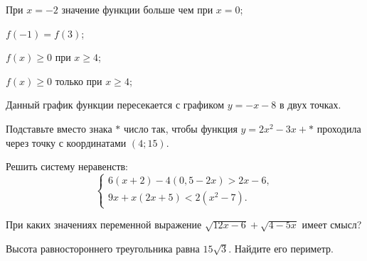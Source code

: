 \begin{class}[number=2]
\begin{listofex}
\begin{enumcols}[itemcolumns=1]
			\item При \( x=-2 \) значение функции больше чем при \( x=0 \);
			\item \( f(-1)=f(3) \);
			\item \( f(x)\ge0 \) при \( x\ge4 \);
			\item \( f(x)\ge0 \) только при \( x\ge4 \);
			\item Данный график функции пересекается с графиком \( y=-x-8 \) в двух точках.
		\end{enumcols}
		\item Подставьте вместо знака \( * \) число так, чтобы функция \( y=2x^2-3x+* \) проходила через точку с координатами \( (4;15) \).
		\item Решить систему неравенств:
		\[ \left\{
		\begin{array}{l}
			6(x+2)-4(0,5-2x)>2x-6,\\
			9x+x(2x+5)<2(x^2-7).
		\end{array}
		\right. \]
		\item При каких значениях переменной выражение \( \sqrt{12x-6}+\sqrt{4-5x} \) имеет смысл?
		\item Высота равностороннего треугольника равна \( 15\sqrt{3} \). Найдите его периметр.
	\end{listofex}
\end{class}
%
%
%
%
